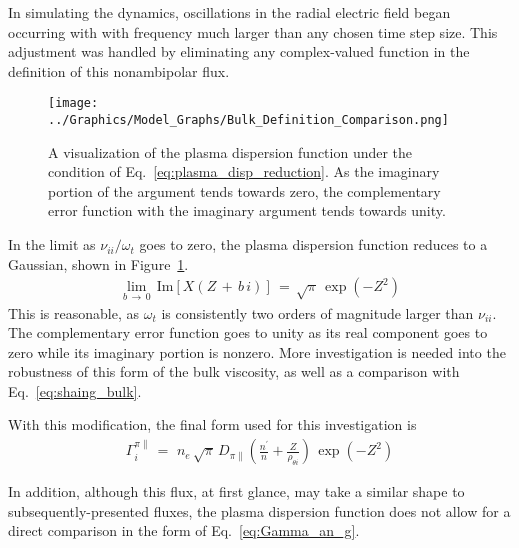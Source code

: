 In simulating the dynamics, oscillations in the radial electric field began occurring with with frequency much larger than any chosen time step size.
This adjustment was handled by eliminating any complex-valued function in the definition of this nonambipolar flux.
\begin{figure}[tb] %
	\centering
	\texttt{[image: ../Graphics/Model\_Graphs/Bulk\_Definition\_Comparison.png]}
	\caption{A visualization of the plasma dispersion function under the condition of Eq.~\ref{eq:plasma_disp_reduction}.
	As the imaginary portion of the argument tends towards zero, the complementary error function with the imaginary argument tends towards unity.}
	\label{fig:bulk_definition_comparison}
\end{figure}

In the limit as $\nu_{ii} / \omega_t$ goes to zero, the plasma dispersion function reduces to a Gaussian, shown in Figure~\ref{fig:bulk_definition_comparison}.
\begin{align} %
	\lim_{b \,\to\, 0} \, \text{Im}\left[X(Z \,+\, b\,i)\right] \,=\, \sqrt{\pi} \,
		\exp(-Z^2) \label{eq:plasma_disp_reduction}
\end{align}
This is reasonable, as $\omega_t$ is consistently two orders of magnitude larger than $\nu_{ii}$.
The complementary error function goes to unity as its real component goes to zero while its imaginary portion is nonzero.
More investigation is needed into the robustness of this form of the bulk viscosity, as well as a comparison with Eq.~\ref{eq:shaing_bulk}.

With this modification, the final form used for this investigation is
\begin{align} %
	\Gamma_i^{\pi\parallel} \,=\, \,n_e \, \sqrt{\pi} \, D_{\pi\parallel}
		\left(\frac{n^\prime}{n} + \frac{Z}{\rho_{\theta i}}\right) \,
		\exp\left(-Z^2\right) \label{eq:Gamma_bulk_final}
\end{align}

In addition, although this flux, at first glance, may take a similar shape to subsequently-presented fluxes, the plasma dispersion function does not allow for a direct comparison in the form of Eq.~\ref{eq:Gamma_an_g}.


